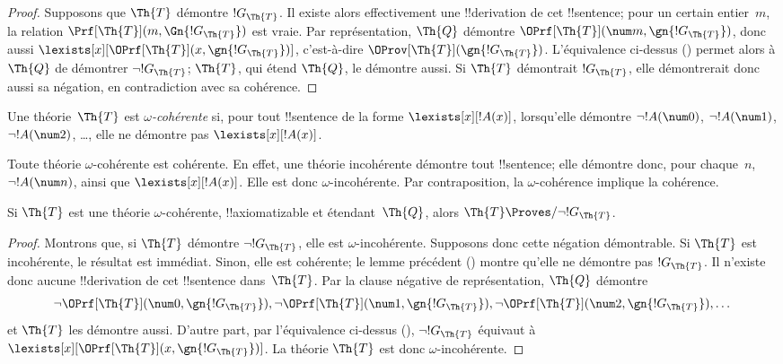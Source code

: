 \documentclass[../../../include/open-logic-section]{subfiles}
\begin{document}
\begin{proof}
Supposons que $\Th{T}$ démontre $!G_\Th{T}$.
Il existe alors effectivement une !!{derivation}
de cet !!{sentence}; pour un certain entier~$m$,
la relation
$\Prf[\Th{T}](m,\Gn{!G_\Th{T}})$ est vraie.
Par représentation, $\Th{Q}$ démontre
$\OPrf[\Th{T}](\num m,\gn{!G_\Th{T}})$,
donc aussi
$\lexists[x][\OPrf[\Th{T}](x,\gn{!G_\Th{T}})]$,
c'est-à-dire
$\OProv[\Th{T}](\gn{!G_\Th{T}})$.
L'équivalence ci-dessus () permet
alors à $\Th{Q}$ de démontrer $\lnot !G_\Th{T}$;
$\Th{T}$, qui étend $\Th{Q}$, le démontre aussi.
Si $\Th{T}$ démontrait $!G_\Th{T}$, elle
démontrerait donc aussi sa négation, en contradiction
avec sa cohérence.
\end{proof}

\begin{defn}
Une théorie~$\Th{T}$ est \emph{$\omega$-cohérente}
si, pour tout !!{sentence} de la forme
$\lexists[x][!A(x)]$, lorsqu'elle démontre
$\lnot !A(\num 0)$, $\lnot !A(\num 1)$,
$\lnot !A(\num 2)$, \dots, elle ne démontre pas
$\lexists[x][!A(x)]$.
\end{defn}

Toute théorie $\omega$-cohérente est cohérente.
En effet, une théorie incohérente démontre tout
!!{sentence}; elle démontre donc, pour chaque~$n$,
$\lnot !A(\num n)$, ainsi que
$\lexists[x][!A(x)]$. Elle est donc
$\omega$-incohérente. Par contraposition,
la $\omega$-cohérence implique la cohérence.

\begin{lem}
Si $\Th{T}$ est une théorie $\omega$-cohérente,
!!{axiomatizable} et étendant~$\Th{Q}$, alors
$\Th{T}\Proves/\lnot !G_\Th{T}$.
\end{lem}

\begin{proof}
Montrons que, si $\Th{T}$ démontre
$\lnot !G_\Th{T}$, elle est $\omega$-incohérente.
Supposons donc cette négation démontrable.
Si $\Th{T}$ est incohérente, le résultat est
immédiat. Sinon, elle est cohérente; le lemme
précédent () montre
qu'elle ne démontre pas $!G_\Th{T}$.
Il n'existe donc aucune !!{derivation} de cet
!!{sentence} dans~$\Th{T}$. Par la clause
négative de représentation, $\Th{Q}$ démontre
\[
\lnot\OPrf[\Th{T}](\num 0,\gn{!G_\Th{T}}),
\lnot\OPrf[\Th{T}](\num 1,\gn{!G_\Th{T}}),
\lnot\OPrf[\Th{T}](\num 2,\gn{!G_\Th{T}}),\dots
\]
et $\Th{T}$ les démontre aussi. D'autre part,
par l'équivalence ci-dessus (),
$\lnot !G_\Th{T}$ équivaut à
$\lexists[x][\OPrf[\Th{T}](x,\gn{!G_\Th{T}})]$.
La théorie $\Th{T}$ est donc $\omega$-incohérente.
\end{proof}
\end{document}
